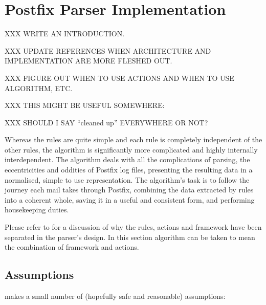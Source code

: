 \section{Postfix Parser Implementation}

XXX WRITE AN INTRODUCTION\@.

XXX UPDATE REFERENCES WHEN ARCHITECTURE AND IMPLEMENTATION ARE MORE FLESHED
OUT\@.

XXX FIGURE OUT WHEN TO USE ACTIONS AND WHEN TO USE ALGORITHM, ETC\@.

XXX THIS MIGHT BE USEFUL SOMEWHERE\@:

XXX SHOULD I SAY ``cleaned up'' EVERYWHERE OR NOT\@?

Whereas the rules are quite simple and each rule is completely independent
of the other rules, the algorithm is significantly more complicated and
highly internally interdependent.  The algorithm deals with all the
complications of parsing, the eccentricities and oddities of Postfix log
files, presenting the resulting data in a normalised, simple to use
representation.  The algorithm's task is to follow the journey each mail
takes through Postfix, combining the data extracted by rules into a
coherent whole, saving it in a useful and consistent form, and performing
housekeeping duties.

Please refer to  for a discussion of why the
rules, actions and framework have been separated in the parser's design.
In this section algorithm can be taken to mean the combination of framework
and actions.


\subsection{Assumptions}

\parsername{} makes a small number of (hopefully safe and reasonable)
assumptions:


